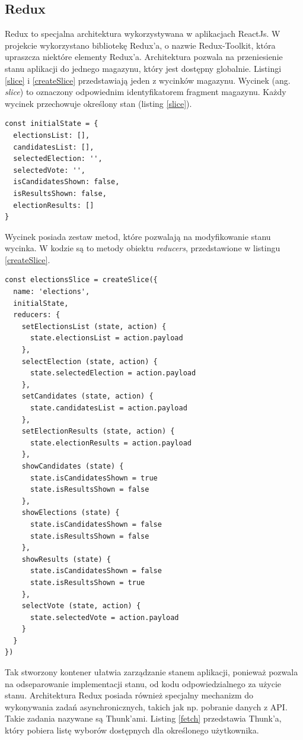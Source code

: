 \documentclass[a4paper,12pt]{book}
\begin{document}
\subsection{Redux}

Redux to specjalna architektura wykorzystywana w aplikacjach ReactJs. W projekcie wykorzystano bibliotekę Redux'a, o nazwie Redux-Toolkit, która upraszcza niektóre elementy Redux'a. Architektura pozwala na przeniesienie stanu aplikacji do jednego magazynu, który jest dostępny globalnie. Listingi \ref{slice} i  \ref{createSlice} przedstawiają jeden z wycinków magazynu. Wycinek (ang. \textit{slice}) to oznaczony odpowiednim identyfikatorem fragment magazynu. Każdy wycinek przechowuje określony stan (listing \ref{slice}).

\begin{lstlisting}[style=ES6, caption={Stan początkowy wycinka \textit{electionsSlice}.}, label={slice}]
const initialState = {
  electionsList: [],
  candidatesList: [],
  selectedElection: '',
  selectedVote: '',
  isCandidatesShown: false,
  isResultsShown: false,
  electionResults: []
}
\end{lstlisting}

Wycinek posiada zestaw metod, które pozwalają na modyfikowanie stanu wycinka. W kodzie są to metody obiektu \textit{reducers}, przedstawione w listingu \ref{createSlice}.

\begin{lstlisting}[style=ES6, caption={Wycinek \textit{electionsSlice}.}, label={createSlice}]
const electionsSlice = createSlice({
  name: 'elections',
  initialState,
  reducers: {
    setElectionsList (state, action) {
      state.electionsList = action.payload
    },
    selectElection (state, action) {
      state.selectedElection = action.payload
    },
    setCandidates (state, action) {
      state.candidatesList = action.payload
    },
    setElectionResults (state, action) {
      state.electionResults = action.payload
    },
    showCandidates (state) {
      state.isCandidatesShown = true
      state.isResultsShown = false
    },
    showElections (state) {
      state.isCandidatesShown = false
      state.isResultsShown = false
    },
    showResults (state) {
      state.isCandidatesShown = false
      state.isResultsShown = true
    },
    selectVote (state, action) {
      state.selectedVote = action.payload
    }
  }
})
\end{lstlisting}

Tak stworzony kontener ułatwia zarządzanie stanem aplikacji, ponieważ pozwala na odseparowanie implementacji stanu, od kodu odpowiedzialnego za użycie stanu. Architektura Redux posiada również specjalny mechanizm do wykonywania zadań asynchronicznych, takich jak np. pobranie danych z API. Takie zadania nazywane są Thunk'ami. Listing \ref{fetch} przedstawia Thunk'a, który pobiera listę wyborów dostępnych dla określonego użytkownika.
\end{document}
